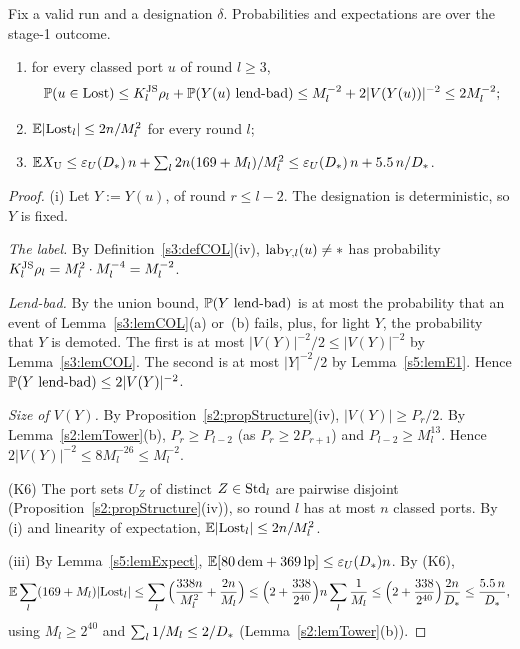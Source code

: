 \begin{lemma}\label{s6:lemLost}
Fix a valid run and a designation $\delta$. Probabilities and expectations are over the stage-1 outcome.
\begin{enumerate}
\item[(i)] for every classed port $u$ of round $l\ge3$,
\[
\mathbb{P}(u\in\mathrm{Lost})\le K^{\mathrm{JS}}_l\rho_l+\mathbb{P}(Y(u)\text{ lend-bad})\le M_l^{-2}+2|V(Y(u))|^{-2}\le2M_l^{-2};
\]
\item[\textup{(K6)}] $\mathbb{E}|\mathrm{Lost}_l|\le2n/M_l^2$ for every round $l$;
\item[(iii)] $\mathbb{E}X_{\mathrm{U}}\le\varepsilon_{U}(D_{*})\,n+\sum_l2n(169+M_l)/M_l^2\le\varepsilon_{U}(D_{*})\,n+5.5\,n/D_{*}$.
\end{enumerate}
\deps{\ref{s6:defLending}, \ref{s3:lemCOL}, \ref{s5:lemE1}, \ref{s5:lemExpect}, \ref{s2:propStructure}, \ref{s2:lemTower}, \ref{s3:defCOL}}
\end{lemma}

\begin{proof}
(i) Let $Y:=Y(u)$, of round $r\le l-2$. The designation is deterministic, so $Y$ is fixed.

\emph{The label.} By Definition~\ref{s3:defCOL}(iv), $\mathrm{lab}_{Y,l}(u)\neq*$ has probability $K^{\mathrm{JS}}_l\rho_l=M_l^2\cdot M_l^{-4}=M_l^{-2}$.

\emph{Lend-bad.} By the union bound, $\mathbb{P}(Y\text{ lend-bad})$ is at most the probability that an event of Lemma~\ref{s3:lemCOL}(a) or~(b) fails, plus, for light $Y$, the probability that $Y$ is demoted. The first is at most $|V(Y)|^{-2}/2\le|V(Y)|^{-2}$ by Lemma~\ref{s3:lemCOL}. The second is at most $|Y|^{-2}/2$ by Lemma~\ref{s5:lemE1}. Hence $\mathbb{P}(Y\text{ lend-bad})\le2|V(Y)|^{-2}$.

\emph{Size of $V(Y)$.} By Proposition~\ref{s2:propStructure}(iv), $|V(Y)|\ge P_r/2$. By Lemma~\ref{s2:lemTower}(b), $P_r\ge P_{l-2}$ (as $P_r\ge2P_{r+1}$) and $P_{l-2}\ge M_l^{13}$. Hence $2|V(Y)|^{-2}\le8M_l^{-26}\le M_l^{-2}$.

(K6) The port sets $U_Z$ of distinct $Z\in\mathrm{Std}_l$ are pairwise disjoint (Proposition~\ref{s2:propStructure}(iv)), so round $l$ has at most $n$ classed ports. By (i) and linearity of expectation, $\mathbb{E}|\mathrm{Lost}_l|\le2n/M_l^2$.

(iii) By Lemma~\ref{s5:lemExpect}, $\mathbb{E}[80\,\mathrm{dem}+369\,\mathrm{lp}]\le\varepsilon_{U}(D_{*})n$. By (K6),
\[
\mathbb{E}\sum_l(169+M_l)|\mathrm{Lost}_l|\le\sum_l\Big(\frac{338n}{M_l^2}+\frac{2n}{M_l}\Big)\le\Big(2+\frac{338}{2^{40}}\Big)n\sum_l\frac1{M_l}\le\Big(2+\frac{338}{2^{40}}\Big)\frac{2n}{D_{*}}\le\frac{5.5\,n}{D_{*}},
\]
using $M_l\ge2^{40}$ and $\sum_l1/M_l\le2/D_{*}$ (Lemma~\ref{s2:lemTower}(b)).
\end{proof}


